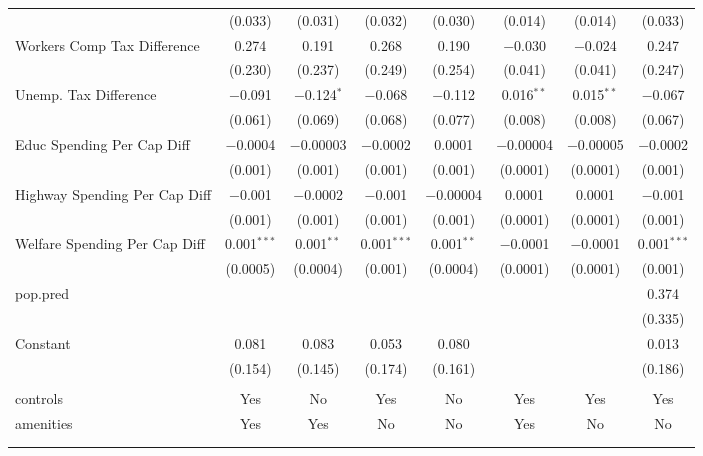 \begin{table}[!htbp]
\begin{tabular}{@{\extracolsep{5pt}}lccccccc}
  & (0.033) & (0.031) & (0.032) & (0.030) & (0.014) & (0.014) & (0.033) \\ 
  Workers Comp Tax Difference & 0.274 & 0.191 & 0.268 & 0.190 & $-$0.030 & $-$0.024 & 0.247 \\ 
  & (0.230) & (0.237) & (0.249) & (0.254) & (0.041) & (0.041) & (0.247) \\ 
  Unemp. Tax Difference & $-$0.091 & $-$0.124$^{*}$ & $-$0.068 & $-$0.112 & 0.016$^{**}$ & 0.015$^{**}$ & $-$0.067 \\ 
  & (0.061) & (0.069) & (0.068) & (0.077) & (0.008) & (0.008) & (0.067) \\ 
  Educ Spending Per Cap Diff & $-$0.0004 & $-$0.00003 & $-$0.0002 & 0.0001 & $-$0.00004 & $-$0.00005 & $-$0.0002 \\ 
  & (0.001) & (0.001) & (0.001) & (0.001) & (0.0001) & (0.0001) & (0.001) \\ 
  Highway Spending Per Cap Diff & $-$0.001 & $-$0.0002 & $-$0.001 & $-$0.00004 & 0.0001 & 0.0001 & $-$0.001 \\ 
  & (0.001) & (0.001) & (0.001) & (0.001) & (0.0001) & (0.0001) & (0.001) \\ 
  Welfare Spending Per Cap Diff & 0.001$^{***}$ & 0.001$^{**}$ & 0.001$^{***}$ & 0.001$^{**}$ & $-$0.0001 & $-$0.0001 & 0.001$^{***}$ \\ 
  & (0.0005) & (0.0004) & (0.001) & (0.0004) & (0.0001) & (0.0001) & (0.001) \\ 
  pop.pred &  &  &  &  &  &  & 0.374 \\ 
  &  &  &  &  &  &  & (0.335) \\ 
  Constant & 0.081 & 0.083 & 0.053 & 0.080 &  &  & 0.013 \\ 
  & (0.154) & (0.145) & (0.174) & (0.161) &  &  & (0.186) \\ 
 \hline \\[-1.8ex] 
controls & Yes & No & Yes & No & Yes & Yes & Yes \\ 
amenities & Yes & Yes & No & No & Yes & No & No \\ 
\hline \\[-1.8ex] 
\hline 
\hline \\[-1.8ex] 
\end{tabular} 
\end{table} 
